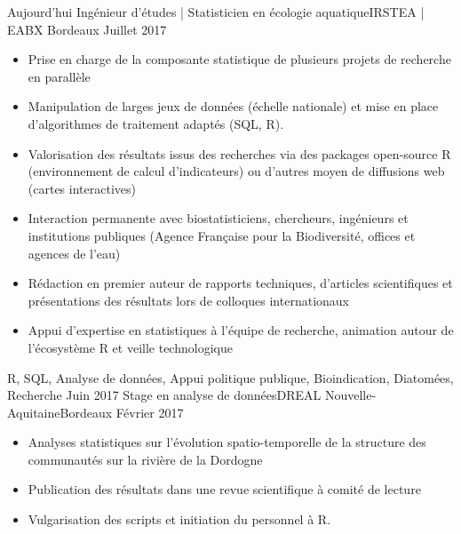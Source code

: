 \documentclass[localFont,alternative]{yaac-another-awesome-cv}
\begin{document}
\begin{experiences}
  \experience
    {Aujourd'hui}   {Ingénieur d'études | Statisticien en écologie aquatique}{IRSTEA | EABX }{Bordeaux}
    {Juillet 2017} {
                      \begin{itemize}                    
                        \item Prise en charge de la composante statistique de plusieurs projets de recherche en parallèle
                        \item Manipulation de larges jeux de données (échelle nationale) et mise en place d'algorithmes de traitement adaptés (SQL, R).
                        \item Valorisation des résultats issus des recherches via des packages open-source R (environnement de calcul d'indicateurs) ou d'autres moyen de diffusions web (cartes interactives)
                        \item Interaction permanente avec biostatisticiens, chercheurs, ingénieurs et institutions publiques (Agence Française pour la Biodiversité, offices et agences de l'eau)
                        \item Rédaction en premier auteur de rapports techniques, d'articles scientifiques et présentations des résultats lors de colloques internationaux
                        \item Appui d'expertise en statistiques à l'équipe de recherche, animation autour de l'écosystème R et veille technologique                                                                         
                      \end{itemize}
                    }
                    {R, SQL, Analyse de données, Appui politique publique, Bioindication, Diatomées, Recherche}
  \emptySeparator
  \experience
    {Juin 2017} {Stage en analyse de données}{DREAL Nouvelle-Aquitaine}{Bordeaux}
    {Février 2017}    {
                      \begin{itemize}                 
                        \item Analyses statistiques sur l’évolution spatio-temporelle de la structure des communautés sur la rivière de la Dordogne
                        \item Publication des résultats dans une revue scientifique à comité de lecture    
                        \item Vulgarisation des scripts et initiation du personnel à R.  
                                                

\end{itemize}}
\end{experiences}
\end{document}
